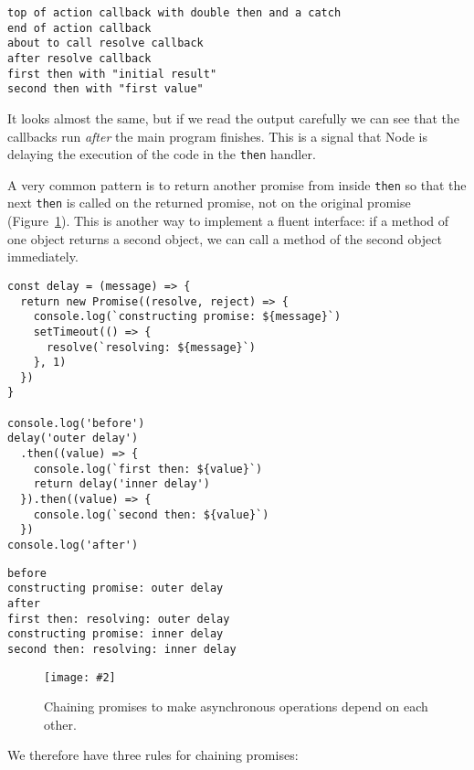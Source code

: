 \documentclass[krantzl]{krantz}
\newcommand{\figpdf}[4]{\begin{figure}%
\centering%
\texttt{[image: \#2]}%
\caption{#3}%
\label{#1}%
\end{figure}}
\newcommand{\figref}[1]{Figure~\ref{#1}}
\begin{document}
\begin{lstlisting}[frame=single,frameround=tttt]
top of action callback with double then and a catch
end of action callback
about to call resolve callback
after resolve callback
first then with "initial result"
second then with "first value"
\end{lstlisting}



It looks almost the same,
but if we read the output carefully
we can see that the callbacks run \emph{after} the main program finishes.
This is a signal that Node is delaying the execution of the code in the \texttt{then} handler.


A very common pattern is to return another promise from inside \texttt{then}
so that the next \texttt{then} is called on the returned promise,
not on the original promise
(\figref{async-programming-chained}).
This is another way to implement a fluent interface:
if a method of one object returns a second object,
we can call a method of the second object immediately.


\begin{lstlisting}[frame=single,frameround=tttt]
const delay = (message) => {
  return new Promise((resolve, reject) => {
    console.log(`constructing promise: ${message}`)
    setTimeout(() => {
      resolve(`resolving: ${message}`)
    }, 1)
  })
}

console.log('before')
delay('outer delay')
  .then((value) => {
    console.log(`first then: ${value}`)
    return delay('inner delay')
  }).then((value) => {
    console.log(`second then: ${value}`)
  })
console.log('after')
\end{lstlisting}



\begin{lstlisting}[frame=single,frameround=tttt]
before
constructing promise: outer delay
after
first then: resolving: outer delay
constructing promise: inner delay
second then: resolving: inner delay
\end{lstlisting}


\figpdf{async-programming-chained}{./async-programming/chained.pdf}{Chaining promises to make asynchronous operations depend on each other.}{0.6}


We therefore have three rules for chaining promises:
\end{document}
